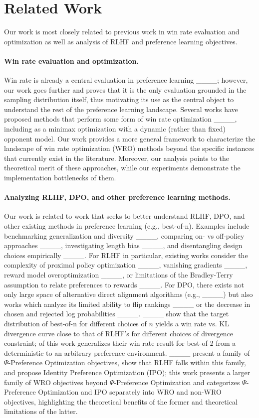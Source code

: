 \section{Related Work}
\label{sec:related}
Our work is most closely related to previous work in win rate evaluation and optimization as well as analysis of RLHF and preference learning objectives.

\paragraph{Win rate evaluation and optimization.} 
Win rate is already a central evaluation in preference learning ____; however, our work goes further and proves that it is the only evaluation grounded in the sampling distribution itself, thus motivating its use as the central object to understand the rest of the preference learning landscape.
Several works have proposed methods that perform some form of win rate optimization ____, including as a minimax optimization with a dynamic (rather than fixed) opponent model. Our work provides a more general framework to characterize the landscape of win rate optimization (WRO) methods beyond the specific instances that currently exist in the literature. Moreover, our analysis points to the theoretical merit of these approaches, while our experiments demonstrate the implementation bottlenecks of them.


\paragraph{Analyzing RLHF, DPO, and other preference learning methods.}
Our work is related to work that seeks to 
better understand RLHF, DPO, and other existing methods in preference learning (e.g., best-of-n). 
Examples include benchmarking generalization and diversity ____, comparing on- vs off-policy approaches ____, investigating length bias ____, and disentangling design choices empirically ____. 
For RLHF in particular, 
existing works consider
the complexity of proximal policy optimization
____,
vanishing gradients ____,
reward model overoptimization ____, or
limitations of the Bradley-Terry assumption to relate preferences to rewards
____.
For DPO, there exists not only large space of alternative direct alignment algorithms (e.g., ____) but also works which analyze its limited ability to flip rankings 
____ or the decrease in chosen and rejected log probabilities ____.
____ show that the target distribution of best-of-n for different choices of $n$ yields a win rate vs. KL divergence curve close to that of RLHF's for different choices of divergence constraint;  of this work generalizes their win rate result for best-of-2 from a deterministic to an arbitrary preference environment.
____ present a family of $\Psi$-Preference Optimization objectives,
show that RLHF falls within this family, and propose Identity Preference Optimization (IPO); this work presents a larger family of WRO objectives beyond $\Psi$-Preference Optimization and categorizes $\Psi$-Preference Optimization and IPO separately into WRO and non-WRO objectives, highlighting the 
theoretical benefits of the former and theoretical limitations of the latter.